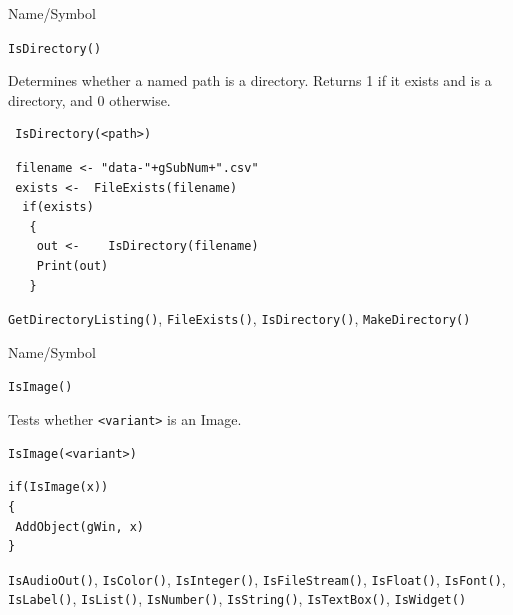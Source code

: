 \begin{desc}{Name/Symbol}
\item[Name/Symbol]	\verb+IsDirectory()+

\item[Description]	Determines whether a named path is a directory.  Returns 1 if it exists and is a directory, and 0 otherwise.
\item[Usage]		
\begin{verbatim}
 IsDirectory(<path>)
\end{verbatim}

\item[Example]	
\begin{verbatim}
 filename <- "data-"+gSubNum+".csv"
 exists <-  FileExists(filename)
  if(exists)
   {
    out <-    IsDirectory(filename)
    Print(out)
   }
\end{verbatim}

\item[See Also]\verb+GetDirectoryListing()+, \verb+FileExists()+,       \verb+IsDirectory()+,        
   \verb+MakeDirectory()+      

\end{desc}


\begin{desc}{Name/Symbol}
\item[Name/Symbol]	\verb+IsImage()+

\item[Description]	Tests whether \verb+<variant>+ is an Image.

\item[Usage]
\begin{verbatim}
IsImage(<variant>)
\end{verbatim}

\item[Example]	
\begin{verbatim}
if(IsImage(x))
{
 AddObject(gWin, x)
}
\end{verbatim}

\item[See Also] \verb+IsAudioOut()+, \verb+IsColor()+,
  \verb+IsInteger()+, \verb+IsFileStream()+, \verb+IsFloat()+,
  \verb+IsFont()+, \verb+IsLabel()+, \verb+IsList()+,
  \verb+IsNumber()+, \verb+IsString()+, \verb+IsTextBox()+,
  \verb+IsWidget()+
\end{desc}



